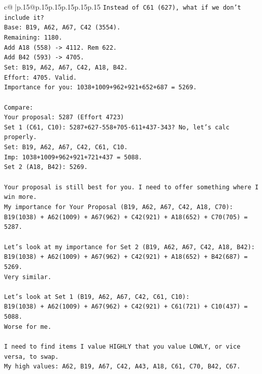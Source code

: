 \documentclass{article}
\begin{document}
{\begin{supertabular}{c@{$\;$}|p{.15\linewidth}@{}p{.15\linewidth}p{.15\linewidth}p{.15\linewidth}p{.15\linewidth}p{.15\linewidth}}
{{{\texttt{Instead of C61 (627), what if we don't include it?} \\
\texttt{Base: B19, A62, A67, C42 (3554).} \\
\texttt{Remaining: 1180.} \\
\texttt{Add A18 (558) {-}> 4112. Rem 622.} \\
\texttt{Add B42 (593) {-}> 4705.} \\
\texttt{Set: B19, A62, A67, C42, A18, B42.} \\
\texttt{Effort: 4705. Valid.} \\
\texttt{Importance for you: 1038+1009+962+921+652+687 = 5269.} \\
\\ 
\texttt{Compare:} \\
\texttt{Your proposal: 5287 (Effort 4723)} \\
\texttt{Set 1 (C61, C10): 5287+627{-}558+705{-}611+437{-}343? No, let's calc properly.} \\
\texttt{Set: B19, A62, A67, C42, C61, C10.} \\
\texttt{Imp: 1038+1009+962+921+721+437 = 5088.} \\
\texttt{Set 2 (A18, B42): 5269.} \\
\\ 
\texttt{Your proposal is still best for you. I need to offer something where I win more.} \\
\texttt{My importance for Your Proposal (B19, A62, A67, C42, A18, C70):} \\
\texttt{B19(1038) + A62(1009) + A67(962) + C42(921) + A18(652) + C70(705) = 5287.} \\
\\ 
\texttt{Let's look at my importance for Set 2 (B19, A62, A67, C42, A18, B42):} \\
\texttt{B19(1038) + A62(1009) + A67(962) + C42(921) + A18(652) + B42(687) = 5269.} \\
\texttt{Very similar.} \\
\\ 
\texttt{Let's look at Set 1 (B19, A62, A67, C42, C61, C10):} \\
\texttt{B19(1038) + A62(1009) + A67(962) + C42(921) + C61(721) + C10(437) = 5088.} \\
\texttt{Worse for me.} \\
\\ 
\texttt{I need to find items I value HIGHLY that you value LOWLY, or vice versa, to swap.} \\
\texttt{My high values: A62, B19, A67, C42, A43, A18, C61, C70, B42, C67.} \\
}}}
\end{supertabular}}
\end{document}
